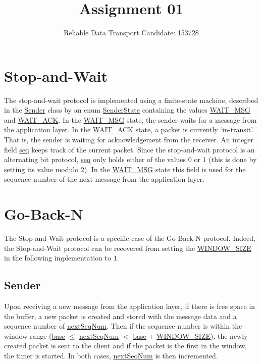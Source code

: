 \documentclass[a4paper]{article}
\title{\vspace{-5ex}Assignment 01}
\author{{Reliable Data Transport \hspace{1cm} Candidate: 153728}}
\date{}
\newcommand{\code}{\url}
\begin{document}
\maketitle
\vspace{-4ex}

\section{Stop-and-Wait}

The stop-and-wait protocol is implemented using a finite-state machine, described in the \code{Sender} class by an enum \code{SenderState} containing the values \code{WAIT_MSG} and \code{WAIT_ACK}. In the \code{WAIT_MSG} state, the sender waits for a message from the application layer. In the \code{WAIT_ACK} state, a packet is currently `in-transit'. That is, the sender is waiting for acknowledgement from the receiver. An integer field \code{seq} keeps track of the current packet. Since the stop-and-wait protocol is an alternating bit protocol, \code{seq} only holds either of the values $0$ or $1$ (this is done by setting its value modulo $2$). In the \code{WAIT_MSG} state this field is used for the sequence number of the next message from the application layer. 

\section{Go-Back-N}

The Stop-and-Wait protocol is a specific case of the Go-Back-N protocol. Indeed, the Stop-and-Wait protocol can be recovered from setting the \code{WINDOW_SIZE} in the following implementation to $1$.

\subsection{Sender}

Upon receiving a new message from the application layer, if there is free space in the buffer, a new packet is created and stored with the message data and a sequence number of \code{nextSeqNum}. Then if the sequence number is within the window range (\code{base} $\leq$ \code{nextSeqNum} $<$ \code{base} + \code{WINDOW_SIZE}), the newly created packet is sent to the client and if the packet is the first in the window, the timer is started. In both cases, \code{nextSeqNum} is then incremented.
\end{document}
